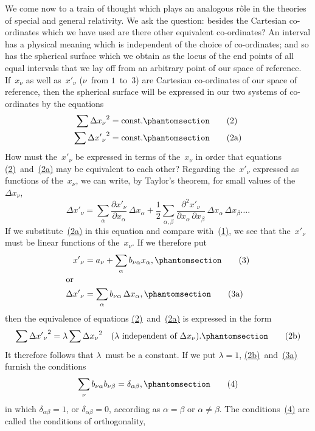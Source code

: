 \documentclass[12pt]{book}[2005/09/16]
\newcommand{\Change}[2]{#2}
\newcommand{\Add}[1]{\Change{}{#1}}
\newcommand{\PageSep}[1]{\ignorespaces}
\newcommand{\Tag}[1]{%
  \phantomsection
  \label{eqn:#1}
  \tag*{#1}
}
\newcommand{\Eqref}[1]{\hyperref[eqn:#1]{#1}}
\newcommand{\dd}{\partial}
\begin{document}
We come now to a train of thought which plays an
analogous rôle in the theories of special and general
relativity. We ask the question: besides the Cartesian
co-ordinates which we have used are there other equivalent
co-ordinates? An interval has a physical meaning which
is independent of the choice of co-ordinates; and so has
the spherical surface which we obtain as the locus of the
end points of all equal intervals that we lay off from an
arbitrary point of our space of reference. If~$x_{\nu}$ as well as~${x'}_{\nu}$
($\nu$~from $1$~to~$3$) are Cartesian co-ordinates of our space
of reference, then the spherical surface will be expressed
in our two systems of co-ordinates by the equations
\begin{align*}
\sum {\Delta x_{\nu}}^{2} &= \text{const.}
\Tag{(2)} \\
\sum {\Delta {x'}_{\nu}}^{2} &= \text{const.}
\Tag{(2a)}
\end{align*}
How must the~${x'}_{\nu}$ be expressed in terms of the~$x_{\nu}$ in order
that equations \Eqref{(2)}~and~\Eqref{(2a)} may be equivalent to each
other? Regarding the~${x'}_{\nu}$ expressed as functions of the~$x_{\nu}$,
we can write, by Taylor's theorem, for small values of
the~${\Delta x}_{\nu}$,
\PageSep{7}
\[
{\Delta x'}_{\nu}
  = \sum_{\alpha} \frac{\dd {x'}_{\nu}}{\dd x_{\alpha}}\, \Delta x_{\alpha}
  + \frac{1}{2} \sum_{\alpha\Add{,}\beta}
    \frac{\dd^{2} {x'}_{\nu}}{\dd x_{\alpha}\, \dd x_{\beta}}\,
    \Delta x_{\alpha}\, \Delta x_{\beta}\ldots\Add{.}
\]
If we substitute~\Eqref{(2a)} in this equation and compare with~\Eqref{(1)},
we see that the~${x'}_{\nu}$ must be linear functions of the~$x_{\nu}$.
If we therefore put
\begin{align*}
{x'}_{\nu} &= a_{\nu} + \sum_{\alpha} b_{\nu\alpha} x_{\alpha}\Add{,}
\Tag{(3)} \\
\intertext{or}
{\Delta x'}_{\nu} &= \sum_{\alpha} b_{\nu\alpha}\, \Delta x_{\alpha}\Add{,}
\Tag{(3a)}
\end{align*}
then the equivalence of equations \Eqref{(2)}~and~\Eqref{(2a)} is expressed
in the form
\[
\sum {{\Delta x'}_{\nu}}^{2} = \lambda \sum {\Delta x_{\nu}}^{2}\quad
\text{($\lambda$~independent of~$\Delta x_{\nu}$).}
\Tag{(2b)}
\]
It therefore follows that $\lambda$~must be a constant. If we put
$\lambda = 1$, \Eqref{(2b)}~and~\Eqref{(3a)} furnish the conditions
\[
\sum_{\nu} b_{\nu\alpha} b_{\nu\beta} = \delta_{\alpha\beta}\Add{,}
\Tag{(4)}
\]
in which $\delta_{\alpha\beta} = 1$, or $\delta_{\alpha\beta} = 0$, according as $\alpha = \beta$ or
$\alpha \neq \beta$. The conditions~\Eqref{(4)} are called the conditions of orthogonality,
\end{document}
